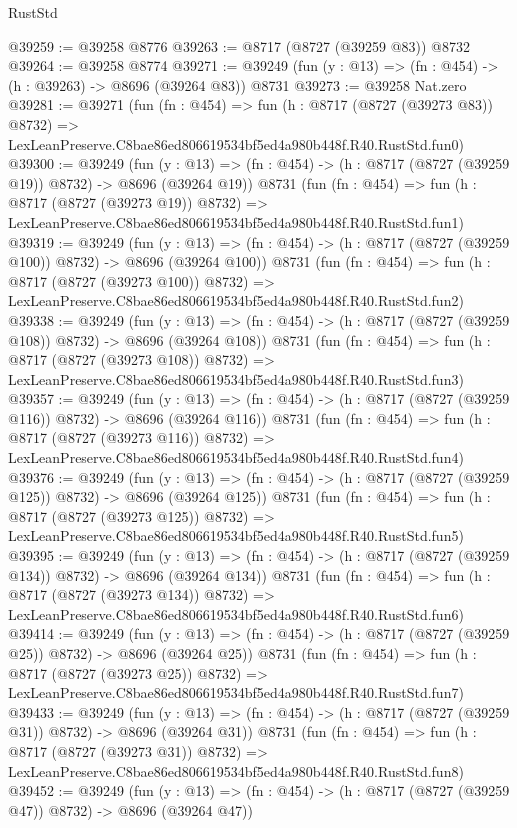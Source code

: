 \begin{lexlean}{RustStd}
\begin{coremodule}
@39259 := @39258 @8776
@39263 := @8717 (@8727 (@39259 @83)) @8732
@39264 := @39258 @8774
@39271 := @39249 (fun (y : @13) => (fn : @454) -> (h : @39263) -> @8696 (@39264 @83)) @8731
@39273 := @39258 Nat.zero
@39281 := @39271
    (fun (fn : @454) =>
    fun (h : @8717 (@8727 (@39273 @83)) @8732) =>
    LexLeanPreserve.C8bae86ed806619534bf5ed4a980b448f.R40.RustStd.fun0)
@39300 := @39249
    (fun (y : @13) => (fn : @454) -> (h : @8717 (@8727 (@39259 @19)) @8732) -> @8696 (@39264 @19))
    @8731
    (fun (fn : @454) =>
    fun (h : @8717 (@8727 (@39273 @19)) @8732) =>
    LexLeanPreserve.C8bae86ed806619534bf5ed4a980b448f.R40.RustStd.fun1)
@39319 := @39249
    (fun (y : @13) => (fn : @454) -> (h : @8717 (@8727 (@39259 @100)) @8732) -> @8696 (@39264 @100))
    @8731
    (fun (fn : @454) =>
    fun (h : @8717 (@8727 (@39273 @100)) @8732) =>
    LexLeanPreserve.C8bae86ed806619534bf5ed4a980b448f.R40.RustStd.fun2)
@39338 := @39249
    (fun (y : @13) => (fn : @454) -> (h : @8717 (@8727 (@39259 @108)) @8732) -> @8696 (@39264 @108))
    @8731
    (fun (fn : @454) =>
    fun (h : @8717 (@8727 (@39273 @108)) @8732) =>
    LexLeanPreserve.C8bae86ed806619534bf5ed4a980b448f.R40.RustStd.fun3)
@39357 := @39249
    (fun (y : @13) => (fn : @454) -> (h : @8717 (@8727 (@39259 @116)) @8732) -> @8696 (@39264 @116))
    @8731
    (fun (fn : @454) =>
    fun (h : @8717 (@8727 (@39273 @116)) @8732) =>
    LexLeanPreserve.C8bae86ed806619534bf5ed4a980b448f.R40.RustStd.fun4)
@39376 := @39249
    (fun (y : @13) => (fn : @454) -> (h : @8717 (@8727 (@39259 @125)) @8732) -> @8696 (@39264 @125))
    @8731
    (fun (fn : @454) =>
    fun (h : @8717 (@8727 (@39273 @125)) @8732) =>
    LexLeanPreserve.C8bae86ed806619534bf5ed4a980b448f.R40.RustStd.fun5)
@39395 := @39249
    (fun (y : @13) => (fn : @454) -> (h : @8717 (@8727 (@39259 @134)) @8732) -> @8696 (@39264 @134))
    @8731
    (fun (fn : @454) =>
    fun (h : @8717 (@8727 (@39273 @134)) @8732) =>
    LexLeanPreserve.C8bae86ed806619534bf5ed4a980b448f.R40.RustStd.fun6)
@39414 := @39249
    (fun (y : @13) => (fn : @454) -> (h : @8717 (@8727 (@39259 @25)) @8732) -> @8696 (@39264 @25))
    @8731
    (fun (fn : @454) =>
    fun (h : @8717 (@8727 (@39273 @25)) @8732) =>
    LexLeanPreserve.C8bae86ed806619534bf5ed4a980b448f.R40.RustStd.fun7)
@39433 := @39249
    (fun (y : @13) => (fn : @454) -> (h : @8717 (@8727 (@39259 @31)) @8732) -> @8696 (@39264 @31))
    @8731
    (fun (fn : @454) =>
    fun (h : @8717 (@8727 (@39273 @31)) @8732) =>
    LexLeanPreserve.C8bae86ed806619534bf5ed4a980b448f.R40.RustStd.fun8)
@39452 := @39249
    (fun (y : @13) => (fn : @454) -> (h : @8717 (@8727 (@39259 @47)) @8732) -> @8696 (@39264 @47))

\end{coremodule}
\end{lexlean}
